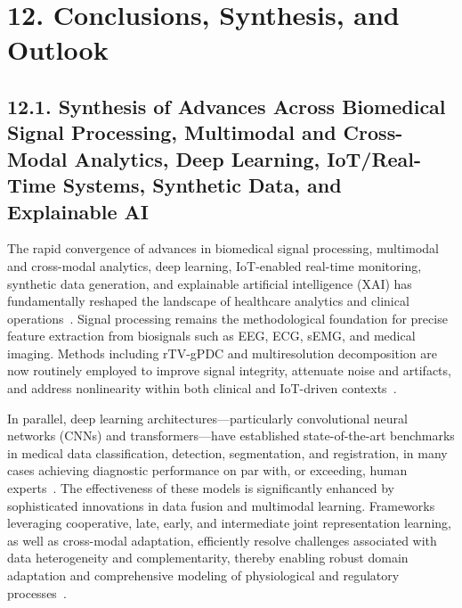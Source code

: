 \documentclass[11pt]{article}
\begin{document}
\section{12. Conclusions, Synthesis, and Outlook}

\subsection{12.1. Synthesis of Advances Across Biomedical Signal Processing, Multimodal and Cross-Modal Analytics, Deep Learning, IoT/Real-Time Systems, Synthetic Data, and Explainable AI}

The rapid convergence of advances in biomedical signal processing, multimodal and cross-modal analytics, deep learning, IoT-enabled real-time monitoring, synthetic data generation, and explainable artificial intelligence (XAI) has fundamentally reshaped the landscape of healthcare analytics and clinical operations~\cite{ref16, ref17, ref18, ref19, ref20, ref21, ref22, ref23, ref24, ref25, ref28, ref29, ref30, ref31, ref32, ref33, ref34, ref35, ref36, ref37, ref38, ref39, ref40, ref41, ref42, ref43, ref44, ref45, ref46, ref47, ref48, ref49, ref50, ref51, ref52, ref53, ref54, ref55, ref56, ref57, ref58, ref59, ref60, ref61, ref62, ref63, ref64, ref65, ref66, ref67, ref68, ref69, ref70, ref71, ref72, ref73, ref74, ref75, ref76, ref77, ref78, ref79, ref80, ref81, ref82, ref83, ref84, ref85, ref86, ref87, ref88, ref89, ref90, ref91, ref92, ref94, ref95, ref96, ref97, ref98, ref99, ref100, ref101, ref102, ref103, ref104, ref105, ref106, ref107}. Signal processing remains the methodological foundation for precise feature extraction from biosignals such as EEG, ECG, sEMG, and medical imaging. Methods including rTV-gPDC and multiresolution decomposition are now routinely employed to improve signal integrity, attenuate noise and artifacts, and address nonlinearity within both clinical and IoT-driven contexts~\cite{ref16, ref17, ref19}. 

In parallel, deep learning architectures—particularly convolutional neural networks (CNNs) and transformers—have established state-of-the-art benchmarks in medical data classification, detection, segmentation, and registration, in many cases achieving diagnostic performance on par with, or exceeding, human experts~\cite{ref40, ref43, ref44, ref49, ref54, ref57, ref60, ref63}. The effectiveness of these models is significantly enhanced by sophisticated innovations in data fusion and multimodal learning. Frameworks leveraging cooperative, late, early, and intermediate joint representation learning, as well as cross-modal adaptation, efficiently resolve challenges associated with data heterogeneity and complementarity, thereby enabling robust domain adaptation and comprehensive modeling of physiological and regulatory processes~\cite{ref30, ref31, ref32, ref33, ref34, ref35, ref36, ref37, ref39, ref41, ref47, ref48, ref51, ref64, ref65}.
\end{document}
